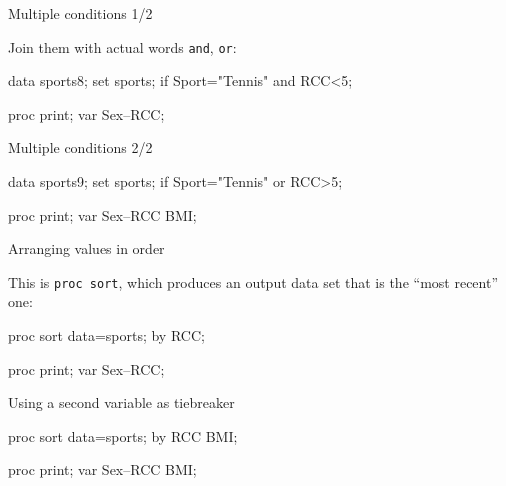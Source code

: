\documentclass[unknownkeysallowed]{beamer}\usepackage[]{graphicx}\usepackage[]{color}
\begin{document}
\begin{frame}[fragile]{Multiple conditions 1/2}
  
  Join them with actual words \texttt{and}, \texttt{or}:
  
  \begin{Datastep}
data sports8;
  set sports;
  if Sport="Tennis" and RCC<5;
  \end{Datastep}
  
  \begin{Sascode}[store=th]
proc print;
  var Sex--RCC;
  \end{Sascode}
  
  
\end{frame}

\begin{frame}[fragile]{Multiple conditions 2/2}
  
  \begin{Datastep}
data sports9;
  set sports;
  if Sport="Tennis" or RCC>5;
  \end{Datastep}
  
  \begin{Sascode}[store=ti]
proc print;
  var Sex--RCC BMI;
  \end{Sascode}
  
\end{frame}

\begin{frame}[fragile]{Arranging values in order}
  
  This is \texttt{proc sort}, which produces an output data set that
  is the ``most recent'' one:
  
  \begin{Sascode}[store=tj]
proc sort data=sports;
  by RCC;
  
proc print;  
  var Sex--RCC;
  \end{Sascode}
  
  
\end{frame}

\begin{frame}[fragile]{Using a second variable as tiebreaker}
  
  
  \begin{Sascode}[store=tk]
proc sort data=sports;
  by RCC BMI;
  
proc print;  
  var Sex--RCC BMI;
  \end{Sascode}
  
  
\end{frame}
\end{document}
